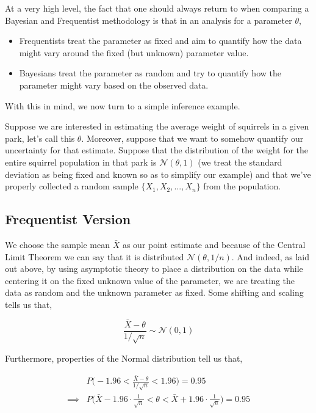 \documentclass[12pt,twoside]{reedthesis}
\begin{document}
At a very high level, the fact that one should always return to when comparing a Bayesian and Frequentist methodology is that in an analysis for a parameter \(\theta\),
\begin{itemize}
\item
  Frequentists treat the parameter as fixed and aim to quantify how the data might vary around the fixed (but unknown) parameter value.
\item
  Bayesians treat the parameter as random and try to quantify how the parameter might vary based on the observed data.
\end{itemize}
With this in mind, we now turn to a simple inference example.

Suppose we are interested in estimating the average weight of squirrels in a given park, let's call this \(\theta\). Moreover, suppose that we want to somehow quantify our uncertainty for that estimate. Suppose that the distribution of the weight for the entire squirrel population in that park is \(\mathcal{N}(\theta, 1)\) (we treat the standard deviation as being fixed and known so as to simplify our example) and that we've properly collected a random sample \(\{X_1, X_2, ..., X_n\}\) from the population.

\hypertarget{frequentist-version}{%
\subsection{Frequentist Version}\label{frequentist-version}}

We choose the sample mean \(\bar{X}\) as our point estimate and because of the Central Limit Theorem we can say that it is distributed \(\mathcal{N}(\theta, 1/n)\). And indeed, as laid out above, by using asymptotic theory to place a distribution on the data while centering it on the fixed unknown value of the parameter, we are treating the data as random and the unknown parameter as fixed. Some shifting and scaling tells us that,

\[
\frac{\bar{X} - \theta}{1/\sqrt{n}} \sim \mathcal{N}(0,1)
\]

Furthermore, properties of the Normal distribution tell us that,

\[
\begin{aligned}
&P\bigg(-1.96 < \frac{\bar{X} - \theta}{1/\sqrt{n}} < 1.96\bigg) = 0.95 \\ \implies &P\bigg(\bar{X} - 1.96\cdot\frac{1}{\sqrt{n}} < \theta < \bar{X} + 1.96\cdot\frac{1}{\sqrt{n}}\bigg) = 0.95
\end{aligned}
\]
\end{document}
